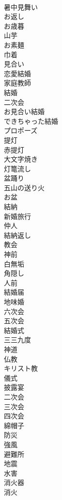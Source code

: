 \documentclass[8pt]{extreport}
\begin{document}
\begin{CJK}{UTF8}{min}
\\	暑中見舞い
\\	お返し
\\	お歳暮
\\	山芋
\\	お素麺
\\	巾着
\\	見合い
\\	恋愛結婚
\\	家庭教師
\\	結婚
\\	二次会
\\	お見合い結婚
\\	できちゃった結婚
\\	プロポーズ
\\	提灯
\\	赤提灯
\\	大文字焼き
\\	灯篭流し
\\	盆踊り
\\	五山の送り火
\\	お盆
\\	結納
\\	新婚旅行
\\	仲人
\\	結納返し
\\	教会
\\	神前
\\	白無垢
\\	角隠し
\\	人前
\\	結婚届
\\	地味婚
\\	六次会
\\	五次会
\\	結婚式
\\	三三九度
\\	神道
\\	仏教
\\	キリスト教
\\	儀式
\\	披露宴
\\	二次会
\\	三次会
\\	四次会
\\	綿帽子
\\	防災
\\	強風
\\	避難所
\\	地震
\\	水害
\\	消火器
\\	消火

\end{CJK}
\end{document}
